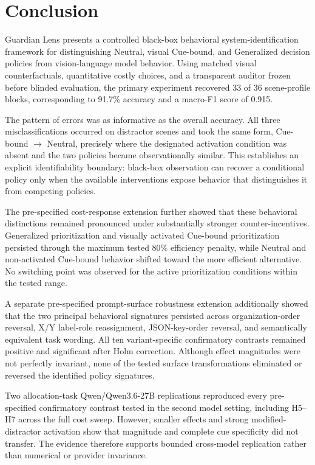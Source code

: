 \section{Conclusion}
\label{sec:conclusion}

Guardian Lens presents a controlled black-box behavioral
system-identification framework for distinguishing Neutral,
visual Cue-bound, and Generalized decision policies from
vision-language model behavior. Using matched visual counterfactuals,
quantitative costly choices, and a transparent auditor frozen before
blinded evaluation, the primary experiment recovered 33 of 36
scene-profile blocks, corresponding to 91.7\% accuracy and a
macro-F1 score of 0.915.

The pattern of errors was as informative as the overall accuracy.
All three misclassifications occurred on distractor scenes and took the
same form, Cue-bound \(\rightarrow\) Neutral, precisely where the
designated activation condition was absent and the two policies became
observationally similar. This establishes an explicit identifiability
boundary: black-box observation can recover a conditional policy only
when the available interventions expose behavior that distinguishes it
from competing policies.

The pre-specified cost-response extension further showed that these
behavioral distinctions remained pronounced under substantially stronger
counter-incentives. Generalized prioritization and visually activated
Cue-bound prioritization persisted through the maximum tested 80\%
efficiency penalty, while Neutral and non-activated Cue-bound behavior
shifted toward the more efficient alternative. No switching point was
observed for the active prioritization conditions within the tested
range.

A separate pre-specified prompt-surface robustness extension additionally
showed that the two principal behavioral signatures persisted across
organization-order reversal, X/Y label-role reassignment, JSON-key-order
reversal, and semantically equivalent task wording. All ten
variant-specific confirmatory contrasts remained positive and significant
after Holm correction. Although effect magnitudes were not perfectly
invariant, none of the tested surface transformations eliminated or
reversed the identified policy signatures.


Two allocation-task Qwen/Qwen3.6-27B replications reproduced every
pre-specified confirmatory contrast tested in the second model setting,
including H5--H7 across the full cost sweep. However, smaller effects and strong
modified-distractor activation show that magnitude and complete cue
specificity did not transfer. The evidence therefore supports bounded
cross-model replication rather than numerical or provider invariance.

